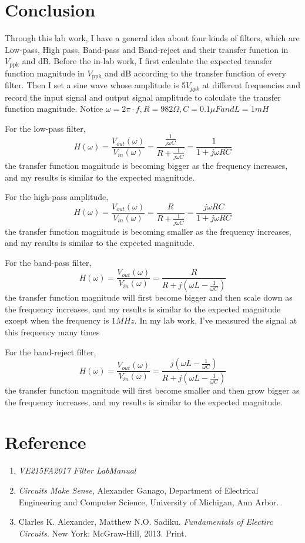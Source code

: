 \documentclass[12pt]{article}
\begin{document}
\section{Conclusion}
Through this lab work, I have a general idea about four kinds of filters, which are Low-pass, High pass, Band-pass and Band-reject and their transfer function in $V_{\mathrm{ppk}}$ and dB. Before the in-lab work, I first calculate the expected transfer function magnitude in $V_{\mathrm{ppk}}$ and dB according to the transfer function of every filter. Then I set a sine wave whose amplitude is 5$V_{ppk}$ at different frequencies and record the input signal and output signal amplitude to calculate the transfer function magnitude. Notice $\omega=2\pi\cdot f,R=982\Omega,C=0.1\mu F and L=1mH$  
\par For the low-pass filter, $$H(\omega)=\frac{V_{out}(\omega)}{V_{in}(\omega)}=\frac{\frac{1}{j\omega C}}{R+\frac{1}{j\omega C}}=\frac{1}{1+j\omega RC}$$the transfer function magnitude is becoming bigger as the frequency increases, and my results is similar to the expected magnitude.
\par For the high-pass amplitude, $$H(\omega)=\frac{V_{out}(\omega)}{V_{in}(\omega)}=\frac{R}{R+\frac{1}{j\omega C}}=\frac{j\omega RC}{1+j\omega RC}$$the transfer function magnitude is becoming smaller as the frequency increases, and my results is similar to the expected magnitude.
\par For the band-pass filter,$$H(\omega)=\frac{V_{out}(\omega)}{V_{in}(\omega)}=\frac{R}{R+j(\omega L-\frac{1}{\omega C})}$$the transfer function magnitude will first become bigger and then scale down as the frequency increases, and my results is similar to the expected magnitude except when the frequency is $1MHz$. In my lab work, I've measured the signal at this frequency many times
\par For the band-reject filter, $$H(\omega)=\frac{V_{out}(\omega)}{V_{in}(\omega)}=\frac{j(\omega L-\frac{1}{\omega C})}{R+j(\omega L-\frac{1}{\omega C})}$$the transfer function magnitude will first become smaller and then grow bigger as the frequency increases, and my results is similar to the expected magnitude.
\section{Reference}
\begin{enumerate}[-]
\item \emph{VE215FA2017 Filter LabManual} 
\item \emph{Circuits Make Sense}, Alexander Ganago, Department of Electrical Engineering and Computer Science, University of Michigan, Ann Arbor.
\item Clarles K. Alexander, Matthew N.O. Sadiku. \emph{Fundamentals of Electirc Circuits}. New York: McGraw-Hill, 2013. Print.
\end{enumerate}
\end{document}
